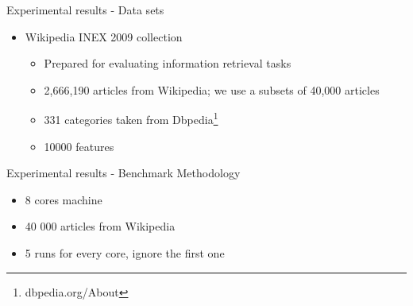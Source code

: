\documentclass{beamer}
\begin{document}

\begin{frame}{Experimental results - Data sets}

\begin{itemize}
\item Wikipedia INEX 2009 collection \citep{conf/btw/SchenkelSK07}

\begin{itemize}
\item Prepared for evaluating information retrieval tasks
\item 2,666,190 articles from Wikipedia; we use a subsets of 40,000 articles
\item 331 categories taken from Dbpedia\footnote{dbpedia.org/About}
\item 10000 features
\end{itemize}

\end{itemize}

\end{frame}


\begin{frame}{Experimental results - Benchmark Methodology}

\begin{itemize}

\item 8 cores machine
\item 40 000 articles from Wikipedia
\item 5 runs for every core, ignore the first one

\end{itemize}

\end{frame}

\end{document}
